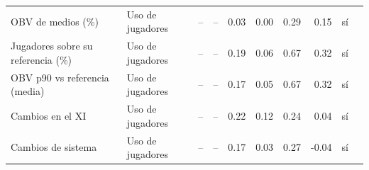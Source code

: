 {\begin{longtable}{p{4.2cm} p{2.3cm} rrrrrrc p{2.9cm}}
OBV de medios (\%) & Uso de jugadores & -- & -- & 0.03 & 0.00 & 0.29 & 0.15 & sí &  \\
Jugadores sobre su referencia (\%) & Uso de jugadores & -- & -- & 0.19 & 0.06 & 0.67 & 0.32 & sí &  \\
OBV p90 vs referencia (media) & Uso de jugadores & -- & -- & 0.17 & 0.05 & 0.67 & 0.32 & sí &  \\
Cambios en el XI & Uso de jugadores & -- & -- & 0.22 & 0.12 & 0.24 & 0.04 & sí &  \\
Cambios de sistema & Uso de jugadores & -- & -- & 0.17 & 0.03 & 0.27 & -0.04 & sí &  \\
\end{longtable}
}